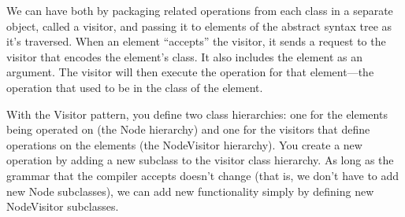 \documentclass[11pt]{report}
\begin{document}
We can have both by packaging related operations from each class in a separate object, called a visitor, and passing it to elements of the abstract syntax tree as it's traversed. When an element ``accepts'' the visitor, it sends 
a request to the visitor that encodes the element's class. It also includes the element as an argument. 
The visitor will then execute the operation for that element---the operation that used to be in the class of the element.

With the Visitor pattern, you define two class hierarchies: one for the elements being operated on (the Node hierarchy) and one for the visitors that define operations on the elements (the NodeVisitor hierarchy). You create a 
new operation by adding a new subclass to the visitor class hierarchy. 
As long as the grammar that the compiler accepts doesn't change (that is, we don't 
have to add new Node subclasses), we can add new functionality simply by defining new NodeVisitor subclasses.
\end{document}
